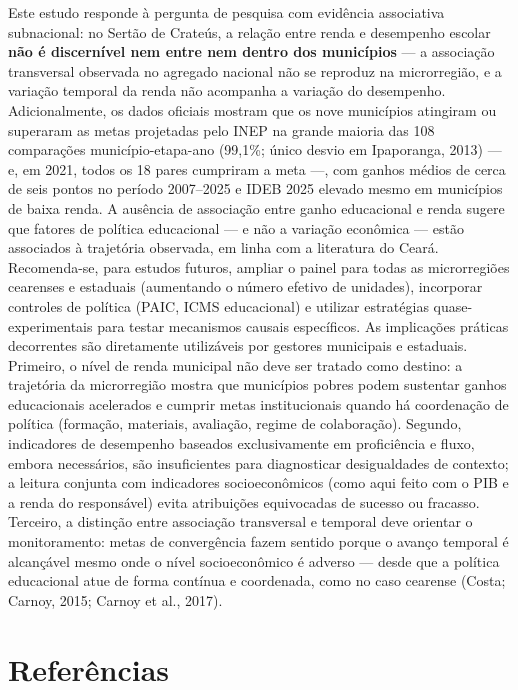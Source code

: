 \documentclass[12pt,a4paper]{article}
\begin{document}
Este estudo responde à pergunta de pesquisa com evidência associativa subnacional: no Sertão de Crateús, a relação entre renda e desempenho escolar \textbf{não é discernível nem entre nem dentro dos municípios} --- a associação transversal observada no agregado nacional não se reproduz na microrregião, e a variação temporal da renda não acompanha a variação do desempenho. Adicionalmente, os dados oficiais mostram que os nove municípios atingiram ou superaram as metas projetadas pelo INEP na grande maioria das 108 comparações município-etapa-ano (99,1\%; único desvio em Ipaporanga, 2013) --- e, em 2021, todos os 18 pares cumpriram a meta ---, com ganhos médios de cerca de seis pontos no período 2007--2025 e IDEB 2025 elevado mesmo em municípios de baixa renda. A ausência de associação entre ganho educacional e renda sugere que fatores de política educacional --- e não a variação econômica --- estão associados à trajetória observada, em linha com a literatura do Ceará. Recomenda-se, para estudos futuros, ampliar o painel para todas as microrregiões cearenses e estaduais (aumentando o número efetivo de unidades), incorporar controles de política (PAIC, ICMS educacional) e utilizar estratégias quase-experimentais para testar mecanismos causais específicos.
As implicações práticas decorrentes são diretamente utilizáveis por gestores municipais e estaduais. Primeiro, o nível de renda municipal não deve ser tratado como destino: a trajetória da microrregião mostra que municípios pobres podem sustentar ganhos educacionais acelerados e cumprir metas institucionais quando há coordenação de política (formação, materiais, avaliação, regime de colaboração). Segundo, indicadores de desempenho baseados exclusivamente em proficiência e fluxo, embora necessários, são insuficientes para diagnosticar desigualdades de contexto; a leitura conjunta com indicadores socioeconômicos (como aqui feito com o PIB e a renda do responsável) evita atribuições equivocadas de sucesso ou fracasso. Terceiro, a distinção entre associação transversal e temporal deve orientar o monitoramento: metas de convergência fazem sentido porque o avanço temporal é alcançável mesmo onde o nível socioeconômico é adverso --- desde que a política educacional atue de forma contínua e coordenada, como no caso cearense (Costa; Carnoy, 2015; Carnoy et al., 2017).


\section*{Referências}
\end{document}
